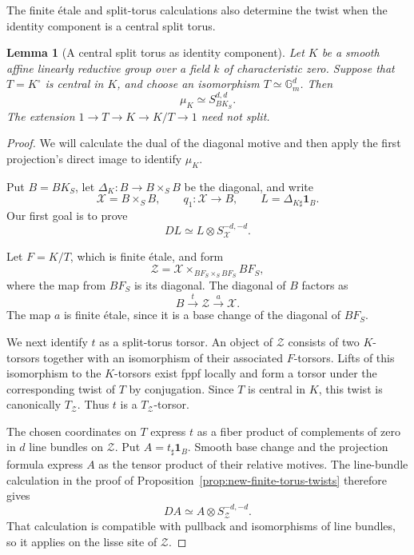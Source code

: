\documentclass[11pt,reqno]{amsart}
\newtheorem{lemma}[theorem]{Lemma}
\theoremstyle{definition}
\theoremstyle{remark}
\theoremstyle{plain}
\numberwithin{equation}{section}
\newcommand{\one}{\mathbf 1}
\newcommand{\Gm}{\mathbb G_m}
\begin{document}
The finite \'etale and split-torus calculations also determine
the twist when the identity component is a central split torus.

\begin{lemma}[A central split torus as identity component]
\label{lem:explicit-central-torus-twist}
Let \(K\) be a smooth affine linearly reductive group over a
field \(k\) of characteristic zero. Suppose that
\(T=K^\circ\) is central in \(K\), and choose an isomorphism
\(T\simeq\Gm^d\).
Then
\[
 \mu_K\simeq S^{d,d}_{BK_S}.
\]
The extension \(1\to T\to K\to K/T\to1\) need not split.
\end{lemma}

\begin{proof}
We will calculate the dual of the diagonal motive and then
apply the first projection's direct image to identify
\(\mu_K\).

Put \(B=BK_S\), let
\(\Delta_K:B\to B\times_S B\) be the diagonal, and write
\[
 \mathcal X=B\times_S B,
 \qquad
 q_1:\mathcal X\to B,
 \qquad
 L=\Delta_{K\sharp}\one_B.
\]
Our first goal is to prove
\[
 DL\simeq L\otimes S^{-d,-d}_{\mathcal X}.
\]

Let \(F=K/T\), which is finite \'etale, and form
\[
 \mathcal Z
 =\mathcal X\times_{BF_S\times_S BF_S}BF_S,
\]
where the map from \(BF_S\) is its diagonal.
The diagonal of \(B\) factors as
\[
 B\xrightarrow{t}\mathcal Z
  \xrightarrow{a}\mathcal X.
\]
The map \(a\) is finite \'etale, since it is a base change
of the diagonal of \(BF_S\).

We next identify \(t\) as a split-torus torsor.
An object of \(\mathcal Z\) consists of two \(K\)-torsors
together with an isomorphism of their associated \(F\)-torsors.
Lifts of this isomorphism to the \(K\)-torsors exist fppf
locally and form a torsor under the corresponding twist of
\(T\) by conjugation. Since \(T\) is central in \(K\), this
twist is canonically \(T_{\mathcal Z}\). Thus \(t\) is a
\(T_{\mathcal Z}\)-torsor.

The chosen coordinates on \(T\) express \(t\) as a fiber
product of complements of zero in \(d\) line bundles on
\(\mathcal Z\). Put \(A=t_\sharp\one_B\).
Smooth base change and the projection formula express \(A\)
as the tensor product of their relative motives.
The line-bundle calculation in the proof of
Proposition~\ref{prop:new-finite-torus-twists} therefore gives
\[
 DA\simeq A\otimes S^{-d,-d}_{\mathcal Z}.
\]
That calculation is compatible with pullback and
isomorphisms of line bundles, so it applies on the lisse
site of \(\mathcal Z\).


\end{proof}
\end{document}
